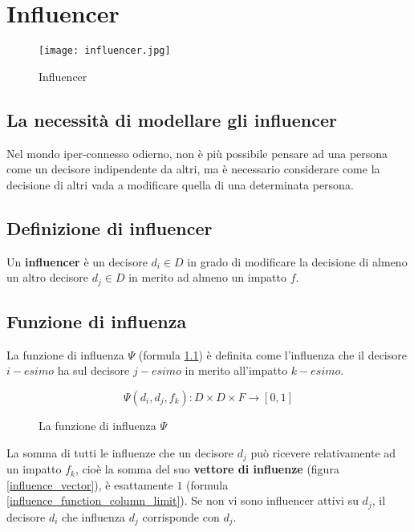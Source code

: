 \documentclass[\main/main.tex]{subfiles}
\begin{document}
\chapter{Influencer}

\begin{figure}
	\texttt{[image: influencer.jpg]}
	\caption{Influencer}
\end{figure}

\section{La necessità di modellare gli influencer}
Nel mondo iper-connesso odierno, non è più possibile pensare ad una persona come un decisore indipendente da altri, ma è necessario considerare come la decisione di altri vada a modificare quella di una determinata persona.

\section{Definizione di influencer}
Un \textbf{influencer} è un decisore $d_i \in D$ in grado di modificare la decisione di almeno un altro decisore $d_j \in D$ in merito ad almeno un impatto $f$.

\section{Funzione di influenza}
La funzione di influenza $\Psi$ (formula \ref{influence_function}) è definita come l'influenza che il decisore $i-esimo$ ha sul decisore $j-esimo$ in merito all'impatto $k-esimo$.

\begin{figure}
	\[
		\Psi(d_i, d_j, f_k): D \times D \times F \rightarrow [0,1]
	\]
	\caption{La funzione di influenza $\Psi$}
	\label{influence_function}
\end{figure}

La somma di tutti le influenze che un decisore $d_j$ può ricevere relativamente ad un impatto $f_k$, cioè la somma del suo \textbf{vettore di influenze} (figura \ref{influence_vector}), è esattamente $1$ (formula \ref{influence_function_column_limit}). Se non vi sono influencer attivi su $d_j$, il decisore $d_i$ che influenza $d_j$ corrisponde con $d_j$.
\end{document}

